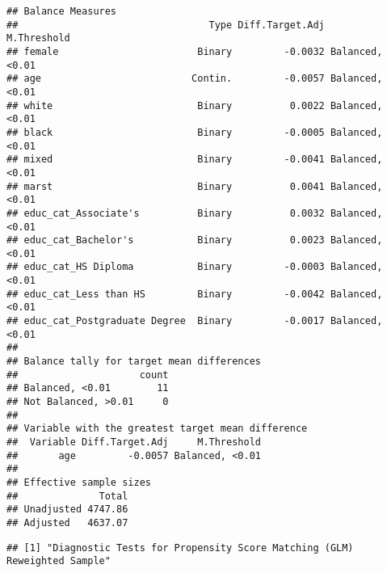 \begin{verbatim}
## Balance Measures
##                                 Type Diff.Target.Adj     M.Threshold
## female                        Binary         -0.0032 Balanced, <0.01
## age                          Contin.         -0.0057 Balanced, <0.01
## white                         Binary          0.0022 Balanced, <0.01
## black                         Binary         -0.0005 Balanced, <0.01
## mixed                         Binary         -0.0041 Balanced, <0.01
## marst                         Binary          0.0041 Balanced, <0.01
## educ_cat_Associate's          Binary          0.0032 Balanced, <0.01
## educ_cat_Bachelor's           Binary          0.0023 Balanced, <0.01
## educ_cat_HS Diploma           Binary         -0.0003 Balanced, <0.01
## educ_cat_Less than HS         Binary         -0.0042 Balanced, <0.01
## educ_cat_Postgraduate Degree  Binary         -0.0017 Balanced, <0.01
## 
## Balance tally for target mean differences
##                     count
## Balanced, <0.01        11
## Not Balanced, >0.01     0
## 
## Variable with the greatest target mean difference
##  Variable Diff.Target.Adj     M.Threshold
##       age         -0.0057 Balanced, <0.01
## 
## Effective sample sizes
##              Total
## Unadjusted 4747.86
## Adjusted   4637.07
\end{verbatim}

\begin{Shaded}
\begin{Highlighting}[]
\SpecialCharTok{$}\OtherTok{\textless{}{-}}\SpecialCharTok{$}

\OtherTok{\textless{}{-}} \NormalTok{(}
  \SpecialCharTok{\textasciitilde{}}\SpecialCharTok{+}\SpecialCharTok{+}\SpecialCharTok{+}\SpecialCharTok{+}\SpecialCharTok{+}\SpecialCharTok{+}\SpecialCharTok{+}
\NormalTok{)}
\end{Highlighting}
\end{Shaded}

\begin{verbatim}
## [1] "Diagnostic Tests for Propensity Score Matching (GLM) Reweighted Sample"
\end{verbatim}

